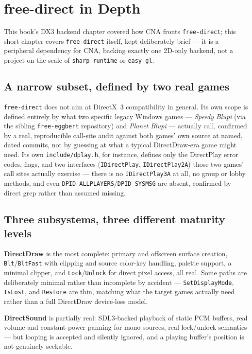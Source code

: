 \chapter{free-direct in Depth}
\label{ch:freedirect-deep-dive}

This book's DX3 backend chapter covered how CNA fronts \texttt{free-direct}; this short
chapter covers \texttt{free-direct} itself, kept deliberately brief --- it is a peripheral
dependency for CNA, backing exactly one 2D-only backend, not a project on the scale of
\texttt{sharp-runtime} or \texttt{easy-gl}.

\section{A narrow subset, defined by two real games}

\texttt{free-direct} does not aim at DirectX~3 compatibility in general. Its own scope is
defined entirely by what two specific legacy Windows games --- \emph{Speedy Blupi} (via the
sibling \texttt{free-eggbert} repository) and \emph{Planet Blupi} --- actually call, confirmed
by a real, reproducible call-site audit against both games' own source at named, dated
commits, not by guessing at what a typical DirectDraw-era game might need. Its own
\texttt{include/dplay.h}, for instance, defines only the DirectPlay error codes, flags, and
two interfaces (\texttt{IDirectPlay}, \texttt{IDirectPlay2A}) those two games' call sites
actually exercise --- there is no \texttt{IDirectPlay3A} at all, no group or lobby methods,
and even \texttt{DPID\_ALLPLAYERS}/\texttt{DPID\_SYSMSG} are absent, confirmed by direct grep
rather than assumed missing.

\section{Three subsystems, three different maturity levels}

\textbf{DirectDraw} is the most complete: primary and offscreen surface creation,
\texttt{Blt}/\texttt{BltFast} with clipping and source color-key handling, palette support,
a minimal clipper, and \texttt{Lock}/\texttt{Unlock} for direct pixel access, all real. Some
paths are deliberately minimal rather than incomplete by accident ---
\texttt{SetDisplayMode}, \texttt{IsLost}, and \texttt{Restore} are thin, matching what the
target games actually need rather than a full DirectDraw device-loss model.

\textbf{DirectSound} is partially real: SDL3-backed playback of static PCM buffers, real
volume and constant-power panning for mono sources, real lock/unlock semantics --- but
looping is accepted and silently ignored, and a playing buffer's position is not genuinely
seekable.

